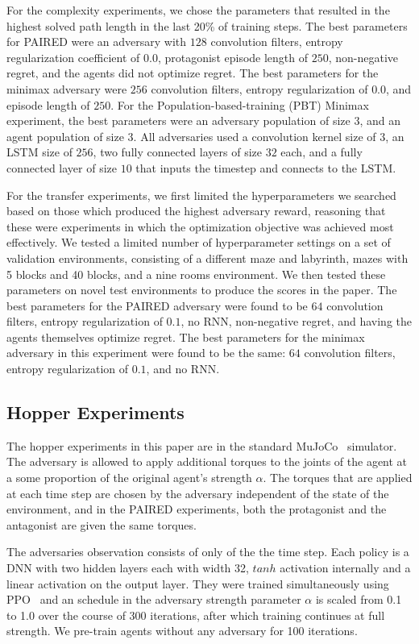 \documentclass{article}
\begin{document}
\begin{appendix}
For the complexity experiments, we chose the parameters that resulted in the highest solved path length in the last 20\% of training steps. The best parameters for PAIRED were an adversary with $128$ convolution filters, entropy regularization coefficient of $0.0$, protagonist episode length of $250$, non-negative regret, and the agents did not optimize regret. The best parameters for the minimax adversary were $256$ convolution filters, entropy regularization of $0.0$, and episode length of $250$. For the Population-based-training (PBT) Minimax experiment, the best parameters were an adversary population of size $3$, and an agent population of size $3$. All adversaries used a convolution kernel size of $3$, an LSTM size of $256$, two fully connected layers of size $32$ each, and a fully connected layer of size $10$ that inputs the timestep and connects to the LSTM. 

For the transfer experiments, we first limited the hyperparameters we searched based on those which produced the highest adversary reward, reasoning that these were experiments in which the optimization objective was achieved most effectively. We tested a limited number of hyperparameter settings on a set of validation environments, consisting of a different maze and labyrinth, mazes with 5 blocks and 40 blocks, and a nine rooms environment. We then tested these parameters on novel test environments to produce the scores in the paper. The best parameters for the PAIRED adversary were found to be $64$ convolution filters, entropy regularization of $0.1$, no RNN, non-negative regret, and having the agents themselves optimize regret. The best parameters for the minimax adversary in this experiment were found to be the same: $64$ convolution filters, entropy regularization of $0.1$, and no RNN. 

\subsection{Hopper Experiments}
The hopper experiments in this paper are in the standard MuJoCo~\citep{todorov2012mujoco} simulator.  The adversary is allowed to apply additional torques to the joints of the agent at a some proportion of the original agent's strength $\alpha$.  The torques that are applied at each time step are chosen by the adversary independent of the state of the environment, and in the PAIRED experiments, both the protagonist and the antagonist are given the same torques.  

The adversaries observation consists of only of the the time step. 
Each policy is a DNN with two hidden layers each with width 32, $tanh$ activation internally and a linear activation on the output layer.  They were trained simultaneously using PPO~\citep{schulman2017proximal} and an schedule in the adversary strength parameter $\alpha$ is scaled from 0.1 to 1.0 over the course of 300 iterations, after which training continues at full strength. We pre-train agents without any adversary for 100 iterations.


\end{appendix}
\end{document}
